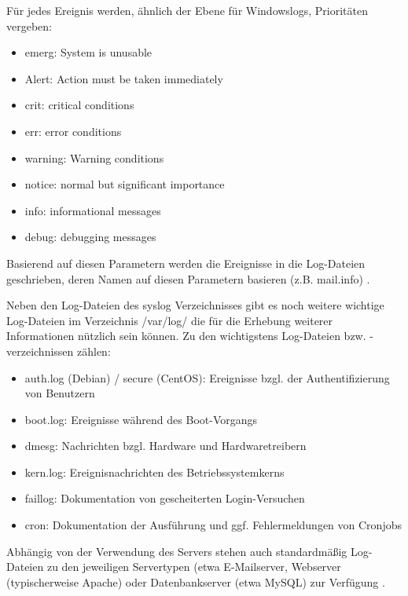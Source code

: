 Für jedes Ereignis werden, ähnlich der Ebene für Windowslogs, Prioritäten vergeben:
\begin{itemize}
\item emerg: System is unusable
\item Alert: Action must be taken immediately
\item crit: critical conditions
\item err: error conditions
\item warning: Warning conditions
\item notice: normal but significant importance
\item info: informational messages
\item debug: debugging messages
\end{itemize}

Basierend auf diesen Parametern werden die Ereignisse in die Log-Dateien geschrieben, deren Namen auf diesen Parametern basieren (z.B. \glqq mail.info\grqq ) \citep{Linux2,Linux3}.

Neben den Log-Dateien des syslog Verzeichnisses gibt es noch weitere wichtige Log-Dateien im Verzeichnis \glqq /var/log/ \grqq  die für die Erhebung weiterer Informationen nützlich sein können. Zu den wichtigstens Log-Dateien bzw. -verzeichnissen zählen:
\begin{itemize}
\item auth.log (Debian) / secure (CentOS): Ereignisse bzgl. der Authentifizierung von Benutzern
\item boot.log: Ereignisse während des Boot-Vorgangs
\item dmesg: Nachrichten bzgl. Hardware und Hardwaretreibern
\item kern.log: Ereignisnachrichten des Betriebssystemkerns
\item faillog: Dokumentation von gescheiterten Login-Versuchen
\item cron: Dokumentation der Ausführung und ggf. Fehlermeldungen von Cronjobs
\end{itemize}

Abhängig von der Verwendung des Servers stehen auch standardmäßig Log-Dateien zu den jeweiligen Servertypen (etwa E-Mailserver, Webserver (typischerweise Apache) oder Datenbankserver (etwa MySQL) zur Verfügung \citep{Linux1,Linux4,Linux5,Linux6}.


